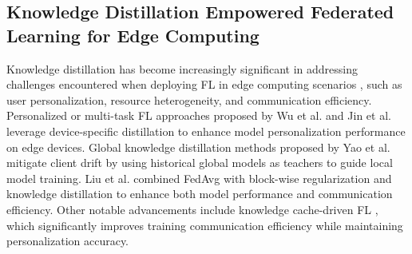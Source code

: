 \documentclass[10pt,journal]{IEEEtran}
\begin{document}
\subsection{Knowledge Distillation Empowered Federated Learning for Edge Computing}
Knowledge distillation has become increasingly significant in addressing challenges encountered when deploying FL in edge computing scenarios \cite{wu2023survey}, such as user personalization, resource heterogeneity, and communication efficiency. Personalized or multi-task FL approaches proposed by Wu et al. \cite{wu2023fedict} and Jin et al. \cite{jin2023personalized} leverage device-specific distillation to enhance model personalization performance on edge devices. Global knowledge distillation methods proposed by Yao et al. \cite{yao2024fedgkd} mitigate client drift by using historical global models as teachers to guide local model training. Liu et al. \cite{liu2024adaptive} combined FedAvg with block-wise regularization and knowledge distillation to enhance both model performance and communication efficiency. Other notable advancements include knowledge cache-driven FL \cite{wu2024fedcache,pan2024fedcache}, which significantly improves training communication efficiency while maintaining personalization accuracy.
\end{document}
